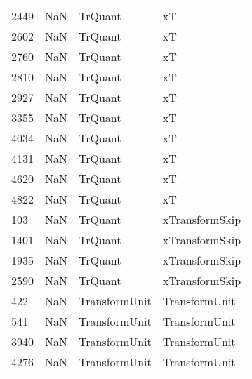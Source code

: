 \begin{tabular}{llll}
2449 &                   NaN &                    TrQuant &                                        xT \\
2602 &                   NaN &                    TrQuant &                                        xT \\
2760 &                   NaN &                    TrQuant &                                        xT \\
2810 &                   NaN &                    TrQuant &                                        xT \\
2927 &                   NaN &                    TrQuant &                                        xT \\
3355 &                   NaN &                    TrQuant &                                        xT \\
4034 &                   NaN &                    TrQuant &                                        xT \\
4131 &                   NaN &                    TrQuant &                                        xT \\
4620 &                   NaN &                    TrQuant &                                        xT \\
4822 &                   NaN &                    TrQuant &                                        xT \\
103  &                   NaN &                    TrQuant &                            xTransformSkip \\
1401 &                   NaN &                    TrQuant &                            xTransformSkip \\
1935 &                   NaN &                    TrQuant &                            xTransformSkip \\
2590 &                   NaN &                    TrQuant &                            xTransformSkip \\
422  &                   NaN &              TransformUnit &                             TransformUnit \\
541  &                   NaN &              TransformUnit &                             TransformUnit \\
3940 &                   NaN &              TransformUnit &                             TransformUnit \\
4276 &                   NaN &              TransformUnit &                             TransformUnit \\

\end{tabular}
